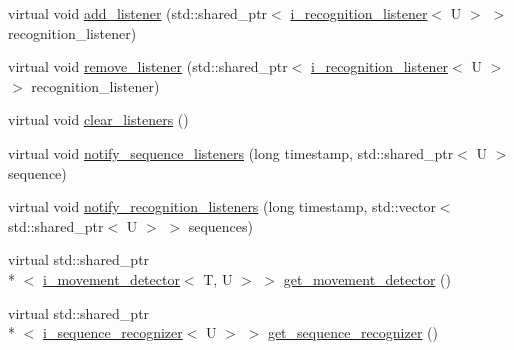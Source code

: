 \begin{DoxyCompactItemize}
\item 
virtual void \hyperlink{classmae_1_1movement__controller_a80b292e1a12f916de2d167f22871c901}{add\-\_\-listener} (std\-::shared\-\_\-ptr$<$ \hyperlink{classmae_1_1i__recognition__listener}{i\-\_\-recognition\-\_\-listener}$<$ U $>$ $>$ recognition\-\_\-listener)
\item 
virtual void \hyperlink{classmae_1_1movement__controller_aafbffa6c9a0d2b73b2036f07c484b6cf}{remove\-\_\-listener} (std\-::shared\-\_\-ptr$<$ \hyperlink{classmae_1_1i__recognition__listener}{i\-\_\-recognition\-\_\-listener}$<$ U $>$ $>$ recognition\-\_\-listener)
\item 
virtual void \hyperlink{classmae_1_1movement__controller_adac2b632e8be6b8e2556005e79b187c3}{clear\-\_\-listeners} ()
\item 
virtual void \hyperlink{classmae_1_1movement__controller_a8e11558479a37a804102c94cfddde14d}{notify\-\_\-sequence\-\_\-listeners} (long timestamp, std\-::shared\-\_\-ptr$<$ U $>$ sequence)
\item 
virtual void \hyperlink{classmae_1_1movement__controller_a3b69de4b97cf639e621692ec8c8a9258}{notify\-\_\-recognition\-\_\-listeners} (long timestamp, std\-::vector$<$ std\-::shared\-\_\-ptr$<$ U $>$ $>$ sequences)
\item 
virtual std\-::shared\-\_\-ptr\\*
$<$ \hyperlink{classmae_1_1i__movement__detector}{i\-\_\-movement\-\_\-detector}$<$ T, U $>$ $>$ \hyperlink{classmae_1_1movement__controller_ad3d0a125556f02ce12a2ca7faf5c1cf3}{get\-\_\-movement\-\_\-detector} ()
\item 
virtual std\-::shared\-\_\-ptr\\*
$<$ \hyperlink{classmae_1_1i__sequence__recognizer}{i\-\_\-sequence\-\_\-recognizer}$<$ U $>$ $>$ \hyperlink{classmae_1_1movement__controller_af7d0eaa65d7a64e5b8169fef192760f6}{get\-\_\-sequence\-\_\-recognizer} ()
\end{DoxyCompactItemize}


